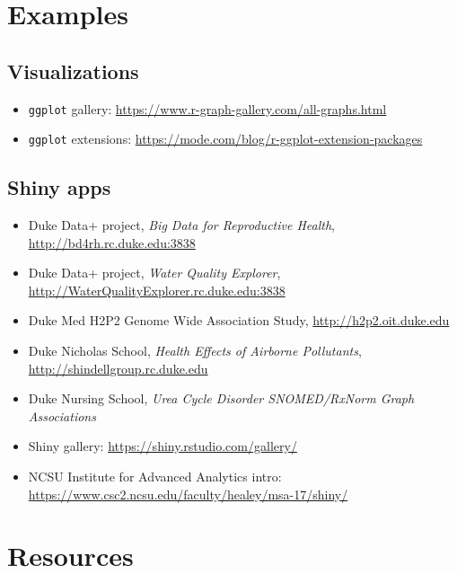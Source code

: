 \documentclass[10pt, letterpaper]{article}
\begin{document}
\begin{spacing}{1.0}
\section{Examples}\label{sec:examples}

\subsection{Visualizations}\label{sec:examplevis}
\begin{itemize}[noitemsep]
    \item \texttt{ggplot} gallery:  \url{https://www.r-graph-gallery.com/all-graphs.html}
    \item \texttt{ggplot} extensions:  \url{https://mode.com/blog/r-ggplot-extension-packages}
\end{itemize}

\subsection{Shiny apps}\label{sec:exampleapps}
\begin{itemize}[noitemsep]
    \item Duke Data+ project, \textit{Big Data for Reproductive Health}, \url{http://bd4rh.rc.duke.edu:3838}
    \item Duke Data+ project, \textit{Water Quality Explorer}, \url{http://WaterQualityExplorer.rc.duke.edu:3838}
    \item Duke Med H2P2 Genome Wide Association Study, \url{http://h2p2.oit.duke.edu}
    \item Duke Nicholas School, \textit{Health Effects of Airborne Pollutants}, \url{http://shindellgroup.rc.duke.edu}
    \item Duke Nursing School, \textit{Urea Cycle Disorder SNOMED/RxNorm Graph Associations}
    \item Shiny gallery:  \url{https://shiny.rstudio.com/gallery/}
    \item NCSU Institute for Advanced Analytics intro:  \url{https://www.csc2.ncsu.edu/faculty/healey/msa-17/shiny/}
\end{itemize}



\section{Resources}\label{sec:resources}

\begin{itemize}


\end{itemize}
\end{spacing}
\end{document}
